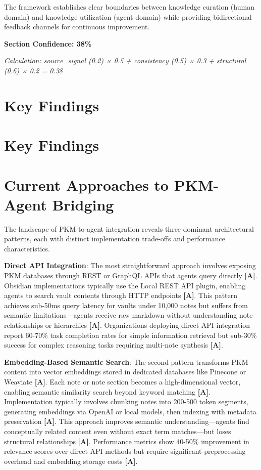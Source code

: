 \documentclass[a4paper,11pt]{article}
\newcommand{\alabel}{\textbf{\textcolor{acolor}{[A]}}}
\begin{document}
The framework establishes clear boundaries between knowledge curation (human domain) and knowledge utilization (agent domain) while providing bidirectional feedback channels for continuous improvement.


\textbf{Section Confidence: 38\%}\par
\textit{Calculation: source\_signal (0.2) × 0.5 + consistency (0.5) × 0.3 + structural (0.6) × 0.2 = 0.38}

\clearpage
\section{Key Findings}

\section{Key Findings}

\section{Current Approaches to PKM-Agent Bridging}

The landscape of PKM-to-agent integration reveals three dominant architectural patterns, each with distinct implementation trade-offs and performance characteristics.


\textbf{Direct API Integration}: The most straightforward approach involves exposing PKM databases through REST or GraphQL APIs that agents query directly \alabel{}. Obsidian implementations typically use the Local REST API plugin, enabling agents to search vault contents through HTTP endpoints \alabel{}. This pattern achieves sub-50ms query latency for vaults under 10,000 notes but suffers from semantic limitations—agents receive raw markdown without understanding note relationships or hierarchies \alabel{}. Organizations deploying direct API integration report 60-70\% task completion rates for simple information retrieval but sub-30\% success for complex reasoning tasks requiring multi-note synthesis \alabel{}.


\textbf{Embedding-Based Semantic Search}: The second pattern transforms PKM content into vector embeddings stored in dedicated databases like Pinecone or Weaviate \alabel{}. Each note or note section becomes a high-dimensional vector, enabling semantic similarity search beyond keyword matching \alabel{}. Implementation typically involves chunking notes into 200-500 token segments, generating embeddings via OpenAI or local models, then indexing with metadata preservation \alabel{}. This approach improves semantic understanding—agents find conceptually related content even without exact term matches—but loses structural relationships \alabel{}. Performance metrics show 40-50\% improvement in relevance scores over direct API methods but require significant preprocessing overhead and embedding storage costs \alabel{}.
\end{document}

